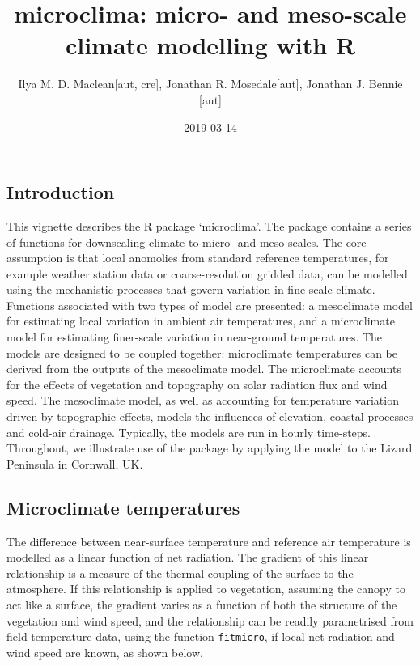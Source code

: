 \documentclass[]{article}
\title{microclima: micro- and meso-scale climate modelling with R}
\author{Ilya M. D. Maclean{[}aut, cre{]}, Jonathan R. Mosedale{[}aut{]},
Jonathan J. Bennie {[}aut{]}}
\date{2019-03-14}
\begin{document}
\maketitle

\subsection{Introduction}\label{introduction}

This vignette describes the R package `microclima'. The package contains
a series of functions for downscaling climate to micro- and meso-scales.
The core assumption is that local anomolies from standard reference
temperatures, for example weather station data or coarse-resolution
gridded data, can be modelled using the mechanistic processes that
govern variation in fine-scale climate. Functions associated with two
types of model are presented: a mesoclimate model for estimating local
variation in ambient air temperatures, and a microclimate model for
estimating finer-scale variation in near-ground temperatures. The models
are designed to be coupled together: microclimate temperatures can be
derived from the outputs of the mesoclimate model. The microclimate
accounts for the effects of vegetation and topography on solar radiation
flux and wind speed. The mesoclimate model, as well as accounting for
temperature variation driven by topographic effects, models the
influences of elevation, coastal processes and cold-air drainage.
Typically, the models are run in hourly time-steps. Throughout, we
illustrate use of the package by applying the model to the Lizard
Peninsula in Cornwall, UK.

\subsection{Microclimate temperatures}\label{microclimate-temperatures}

The difference between near-surface temperature and reference air
temperature is modelled as a linear function of net radiation. The
gradient of this linear relationship is a measure of the thermal
coupling of the surface to the atmosphere. If this relationship is
applied to vegetation, assuming the canopy to act like a surface, the
gradient varies as a function of both the structure of the vegetation
and wind speed, and the relationship can be readily parametrised from
field temperature data, using the function \texttt{fitmicro}, if local
net radiation and wind speed are known, as shown below.
\end{document}
